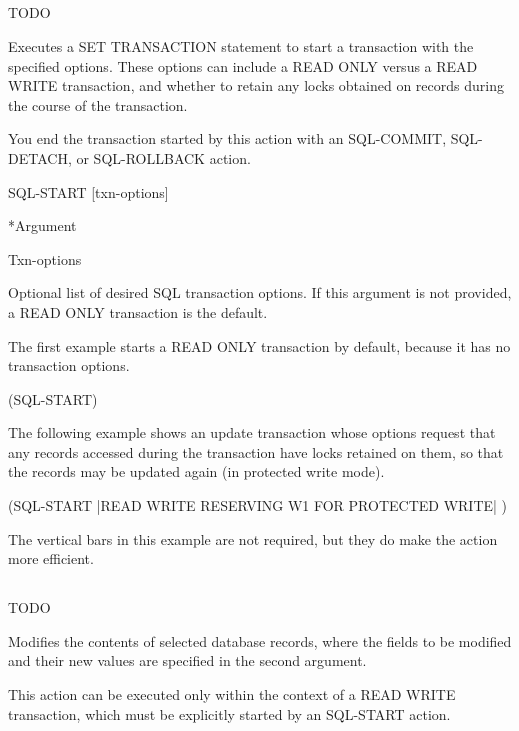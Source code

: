 {{\subsection{}
TODO

Executes a SET TRANSACTION statement to start a transaction
with the specified options. These options can include a READ
ONLY versus a READ WRITE transaction, and whether to retain
any locks obtained on records during the course of the
transaction.

You end the transaction started by this action with an
SQL-COMMIT, SQL-DETACH, or SQL-ROLLBACK action.



\Format

SQL-START [txn-options]



*Argument

Txn-options

Optional list of desired SQL transaction options. If this
argument is not provided, a READ ONLY transaction is the
default.



\Example

The first example starts a READ ONLY transaction by default,
because it has no transaction options.



(SQL-START)



The following example shows an update transaction whose
options request that any records accessed during the
transaction have locks retained on them, so that the records
may be updated again (in protected write mode).



(SQL-START |READ WRITE RESERVING W1 FOR PROTECTED WRITE| )



The vertical bars in this example are not required, but they
do make the action more efficient.

\subsection{}
TODO

Modifies the contents of selected database records, where the
fields to be modified and their new values are specified in
the second argument.

This action can be executed only within the context of a READ
WRITE transaction, which must be explicitly started by an
SQL-START action.



}}
